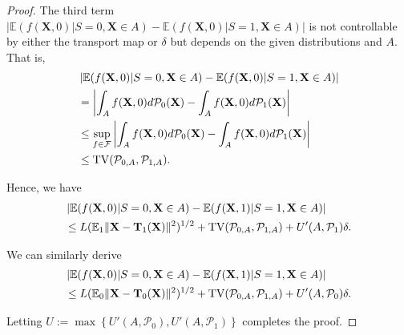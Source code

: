 \documentclass[10pt]{article} %
\begin{document}
\begin{proof}
    The third term 
    $ \vert \mathbb{E} ( f( \mathbf{X}, 0 ) | S = 0, \mathbf{X} \in A ) - \mathbb{E} ( f( \mathbf{X}, 0 ) | S = 1, \mathbf{X} \in A ) \vert $ 
    is not controllable by either the transport map or $\delta$ but depends on the given distributions and $A.$
    That is,
    \begin{equation}
        \begin{split}
            & \left\vert \mathbb{E} ( f( \mathbf{X}, 0 ) | S = 0, \mathbf{X} \in A ) - \mathbb{E} ( f( \mathbf{X}, 0 ) | S = 1, \mathbf{X} \in A ) \right\vert
            \\
            & = \left\vert \int_{A} f(\mathbf{X}, 0) d\mathcal{P}_{0}(\mathbf{X}) - \int_{A} f(\mathbf{X}, 0) d\mathcal{P}_{1}(\mathbf{X}) \right\vert
            \\
            & \le \sup_{f \in \mathcal{F}} \left\vert \int_{A} f(\mathbf{X}, 0) d\mathcal{P}_{0}(\mathbf{X}) - \int_{A} f(\mathbf{X}, 0) d\mathcal{P}_{1}(\mathbf{X}) \right\vert
            \\
            & \le \textup{TV}(\mathcal{P}_{0, A}, \mathcal{P}_{1, A}).
        \end{split}
    \end{equation}
    
    Hence, we have
    \begin{equation}
        \begin{split}
            & \left\vert \mathbb{E} ( f( \mathbf{X}, 0 ) | S = 0, \mathbf{X} \in A ) - \mathbb{E} ( f( \mathbf{X}, 1 ) | S = 1, \mathbf{X} \in A ) \right\vert
            \\
            & \le L (\mathbb{E}_{1} \Vert \mathbf{X} - \mathbf{T}_{1}(\mathbf{X}) \Vert^{2})^{1/2} + \textup{TV}(\mathcal{P}_{0, A}, \mathcal{P}_{1, A}) + U'(A, \mathcal{P}_{1}) \delta.
        \end{split}
    \end{equation}

    We can similarly derive 
    \begin{equation}
        \begin{split}
            & \left\vert \mathbb{E} ( f( \mathbf{X}, 0 ) | S = 0, \mathbf{X} \in A ) - \mathbb{E} ( f( \mathbf{X}, 1 ) | S = 1, \mathbf{X} \in A ) \right\vert
            \\
            & \le L (\mathbb{E}_{0} \Vert \mathbf{X} - \mathbf{T}_{0}(\mathbf{X}) \Vert^{2})^{1/2} + \textup{TV}(\mathcal{P}_{0, A}, \mathcal{P}_{1, A}) + U'(A, \mathcal{P}_{0}) \delta.
        \end{split}
    \end{equation}

Letting $U:= \max \left\{ U'(A, \mathcal{P}_{0}), U'(A, \mathcal{P}_{1}) \right\}$ completes the proof.
\end{proof}
\end{document}
